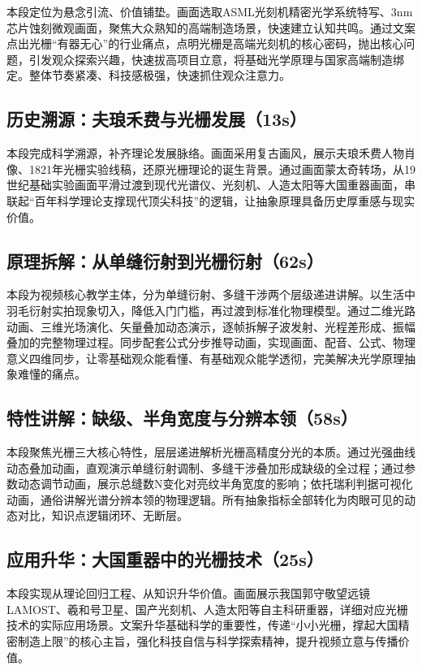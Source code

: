 \documentclass[12pt,a4paper]{ctexrep}
\begin{document}
本段定位为悬念引流、价值铺垫。画面选取ASML光刻机精密光学系统特写、3nm芯片蚀刻微观画面，聚焦大众熟知的高端制造场景，快速建立认知共鸣。通过文案点出光栅“有器无心”的行业痛点，点明光栅是高端光刻机的核心密码，抛出核心问题，引发观众探索兴趣，快速拔高项目立意，将基础光学原理与国家高端制造绑定。整体节奏紧凑、科技感极强，快速抓住观众注意力。

\subsection{历史溯源：夫琅禾费与光栅发展（13s）}

本段完成科学溯源，补齐理论发展脉络。画面采用复古画风，展示夫琅禾费人物肖像、1821年光栅实验线稿，还原光栅理论的诞生背景。通过画面蒙太奇转场，从19世纪基础实验画面平滑过渡到现代光谱仪、光刻机、人造太阳等大国重器画面，串联起“百年科学理论支撑现代顶尖科技”的逻辑，让抽象原理具备历史厚重感与现实价值。

\subsection{原理拆解：从单缝衍射到光栅衍射（62s）}

本段为视频核心教学主体，分为单缝衍射、多缝干涉两个层级递进讲解。以生活中羽毛衍射实拍现象切入，降低入门门槛，再过渡到标准化物理模型。通过二维光路动画、三维光场演化、矢量叠加动态演示，逐帧拆解子波发射、光程差形成、振幅叠加的完整物理过程。同步配套公式分步推导动画，实现画面、配音、公式、物理意义四维同步，让零基础观众能看懂、有基础观众能学透彻，完美解决光学原理抽象难懂的痛点。

\subsection{特性讲解：缺级、半角宽度与分辨本领（58s）}

本段聚焦光栅三大核心特性，层层递进解析光栅高精度分光的本质。通过光强曲线动态叠加动画，直观演示单缝衍射调制、多缝干涉叠加形成缺级的全过程；通过参数动态调节动画，展示总缝数N变化对亮纹半角宽度的影响；依托瑞利判据可视化动画，通俗讲解光谱分辨本领的物理逻辑。所有抽象指标全部转化为肉眼可见的动态对比，知识点逻辑闭环、无断层。

\subsection{应用升华：大国重器中的光栅技术（25s）}

本段实现从理论回归工程、从知识升华价值。画面展示我国郭守敬望远镜LAMOST、羲和号卫星、国产光刻机、人造太阳等自主科研重器，详细对应光栅技术的实际应用场景。文案升华基础科学的重要性，传递“小小光栅，撑起大国精密制造上限”的核心主旨，强化科技自信与科学探索精神，提升视频立意与传播价值。
\end{document}
